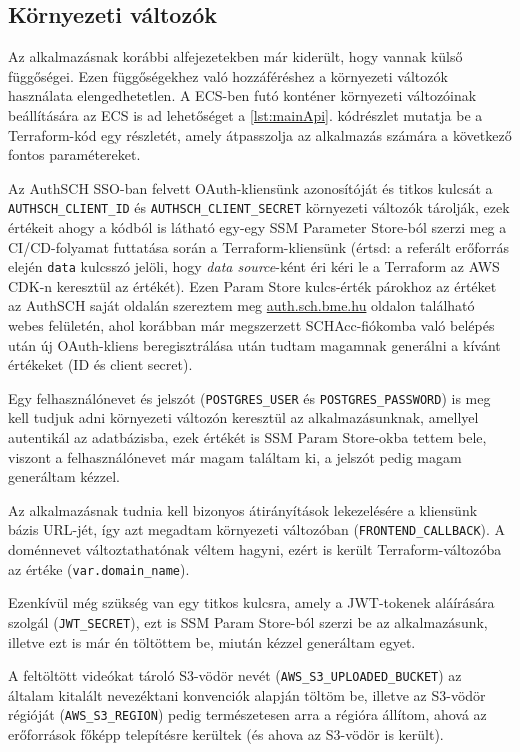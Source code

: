 \subsection{Környezeti változók}\label{sec:envvars}

Az alkalmazásnak korábbi alfejezetekben már kiderült, hogy vannak külső függőségei. Ezen függőségekhez való hozzáféréshez a környezeti változók használata elengedhetetlen. A ECS-ben futó konténer környezeti változóinak beállítására az ECS is ad lehetőséget a \ref{lst:mainApi}. kódrészlet mutatja be a Terraform-kód egy részletét, amely átpasszolja az alkalmazás számára a következő fontos paramétereket.

Az AuthSCH SSO-ban felvett OAuth-kliensünk azonosítóját és titkos kulcsát a \verb|AUTHSCH_CLIENT_ID| és \verb|AUTHSCH_CLIENT_SECRET| környezeti változók tárolják, ezek értékeit ahogy a kódból is látható egy-egy SSM Parameter Store-ból szerzi meg a CI/CD-folyamat futtatása során a Terraform-kliensünk (értsd: a referált erőforrás elején \verb|data| kulcsszó jelöli, hogy \emph{data source}-ként éri kéri le a Terraform az AWS CDK-n keresztül az értékét). Ezen Param Store kulcs-érték párokhoz az értéket az AuthSCH saját oldalán szereztem meg \url{auth.sch.bme.hu} oldalon található webes felületén, ahol korábban már megszerzett SCHAcc-fiókomba való belépés után új OAuth-kliens beregisztrálása után tudtam magamnak generálni a kívánt értékeket (ID és client secret).

Egy felhasználónevet és jelszót (\verb|POSTGRES_USER| és \verb|POSTGRES_PASSWORD|) is meg kell tudjuk adni környezeti változón keresztül az alkalmazásunknak, amellyel autentikál az adatbázisba, ezek értékét is SSM Param Store-okba tettem bele, viszont a felhasználónevet már magam találtam ki, a jelszót pedig magam generáltam kézzel.

Az alkalmazásnak tudnia kell bizonyos átirányítások lekezelésére a kliensünk bázis URL-jét, így azt megadtam környezeti változóban (\verb|FRONTEND_CALLBACK|). A doménnevet változtathatónak véltem hagyni, ezért is került Terraform-változóba az értéke (\verb|var.domain_name|).

Ezenkívül még szükség van egy titkos kulcsra, amely a JWT-tokenek aláírására szolgál (\verb|JWT_SECRET|), ezt is SSM Param Store-ból szerzi be az alkalmazásunk, illetve ezt is már én töltöttem be, miután kézzel generáltam egyet.

A feltöltött videókat tároló S3-vödör nevét (\verb|AWS_S3_UPLOADED_BUCKET|) az általam kitalált nevezéktani konvenciók alapján töltöm be, illetve az S3-vödör régióját (\verb|AWS_S3_REGION|) pedig természetesen arra a régióra állítom, ahová az erőforrások főképp telepítésre kerültek (és ahova az S3-vödör is került).

